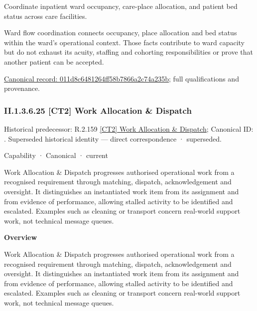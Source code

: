 Coordinate inpatient ward occupancy, care-place allocation, and patient bed status across care facilities.



Ward flow coordination connects occupancy, place allocation and bed status within the ward's operational context. Those facts contribute to ward capacity but do not exhaust its acuity, staffing and cohorting responsibilities or prove that another patient can be accepted.


{\footnotesize \href{../../../../../../../continuum/strategy/capability/feature/011d8c6481264ff58b7866a2c74a235b.md}{Canonical record: 011d8c6481264ff58b7866a2c74a235b}; full qualifications and provenance.}\par
\subsubsection*{II.1.3.6.25 [CT2] Work Allocation \& Dispatch}
\label{navigation:II.1.3.6.25}

{\small Historical predecessor: R.2.159 \hyperref[element:f8c13b6f74b840cc96fbeada5865455a]{[CT2] Work Allocation \& Dispatch}; Canonical ID: \texttt{}. Superseded historical identity — direct correspondence · superseded.}\par
\label{element:152a5252952c405994e9b171234efcb0}
{\small Capability · Canonical · current}\par

Work Allocation \& Dispatch progresses authorised operational work from a recognised requirement through matching, dispatch, acknowledgement and oversight. It distinguishes an instantiated work item from its assignment and from evidence of performance, allowing stalled activity to be identified and escalated. Examples such as cleaning or transport concern real-world support work, not technical message queues.



\textbf{Overview}



Work Allocation \& Dispatch progresses authorised operational work from a recognised requirement through matching, dispatch, acknowledgement and oversight. It distinguishes an instantiated work item from its assignment and from evidence of performance, allowing stalled activity to be identified and escalated. Examples such as cleaning or transport concern real-world support work, not technical message queues.



